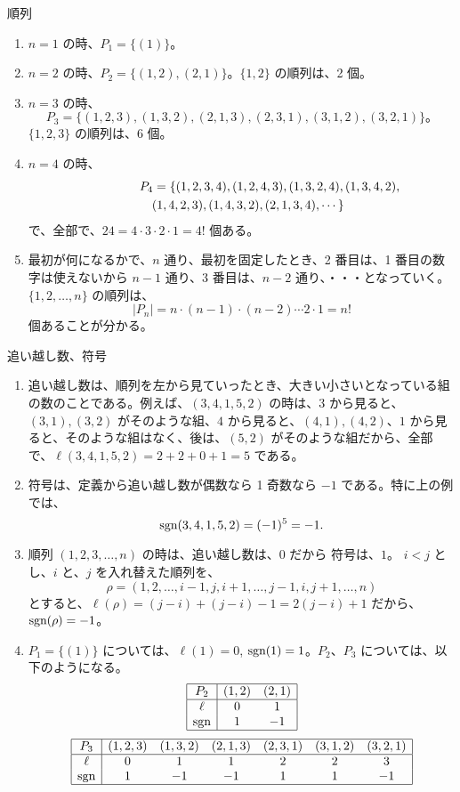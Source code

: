\begin{eg}
順列
\begin{enumerate}
\item $n = 1$ の時、$P_1 = \{(1)\}$。
\item $n = 2$ の時、$P_2 = \{(1,2),(2,1)\}$。$\{1,2\}$ の順列は、2 個。
\item $n = 3$ の時、
$$P_3 = \{(1,2,3),(1,3,2),(2,1,3),(2,3,1),(3,1,2),(3,2,1)\}。$$
$\{1,2,3\}$ の順列は、6 個。
\item $n = 4$ の時、
\begin{eqnarray*}
\lefteqn{P_4 = \{(1,2,3,4),(1,2,4,3),(1,3,2,4),(1,3,4,2),}\\
& & (1,4,2,3),(1,4,3,2),(2,1,3,4),\cdots\}
\end{eqnarray*}
で、全部で、$24  = 4\cdot 3\cdot 2\cdot 1 = 4!$ 個ある。
\item 最初が何になるかで、$n$ 通り、最初を固定したとき、2 番目は、1 番目の数字は使えないから $n-1$ 通り、3 番目は、$n-2$ 通り、・・・となっていく。$\{1,2,\ldots,n\}$ の順列は、
$$|P_n| = n\cdot (n-1)\cdot (n-2)\cdots 2\cdot 1 = n!$$
個あることが分かる。
\end{enumerate}
\end{eg}

\begin{eg}
追い越し数、符号
\begin{enumerate}
\item 追い越し数は、順列を左から見ていったとき、大きい小さいとなっている組の数のことである。例えば、$(3,4,1,5,2)$ の時は、$3$  から見ると、$(3,1),(3,2)$ がそのような組、$4$ から見ると、$(4,1), (4,2)$、$1$ から見ると、そのような組はなく、後は、$(5,2)$ がそのような組だから、全部で、$\ell(3,4,1,5,2) = 2+2+0+1 = 5$ である。
\item 符号は、定義から追い越し数が偶数なら 1 奇数なら $-1$ である。特に上の例では、
$$\mbox{{\rm sgn}}(3,4,1,5,2) = (-1)^5 = -1.$$
\item 順列 $(1,2,3,\ldots,n)$ の時は、追い越し数は、$0$ だから 符号は、$1$。
$i<j$ とし、$i$ と、$j$ を入れ替えた順列を、
$$\rho = (1,2,\ldots, i-1, j, i+1, \ldots, j-1, i, j+1, \ldots, n)$$
とすると、$\ell(\rho) = (j-i) + (j-i)-1 = 2(j-i)+1$ だから、$\mbox{{\rm sgn}}(\rho) = -1$。
\item $P_1 = \{(1)\}$  については、$\ell(1) = 0$, $\mbox{{\rm sgn}}(1) = 1$。$P_2$、$P_3$ については、以下のようになる。
$$\begin{array}{|c|cc|}
\hline
P_2 & (1,2) & (2,1)\\
\hline
\ell & 0 & 1\\
\mbox{{\rm sgn}} & 1 & -1\\
\hline
\end{array}$$
$$\begin{array}{|c|cccccc|}
\hline
P_3 & (1,2,3) & (1,3,2) & (2,1,3) & (2,3,1) & (3,1,2) & (3,2,1)\\
\hline
\ell & 0 & 1 & 1 & 2 & 2 & 3\\
\mbox{{\rm sgn}} & 1 & -1 & -1 & 1 & 1 & -1\\
\hline
\end{array}$$
\end{enumerate}
\end{eg}

